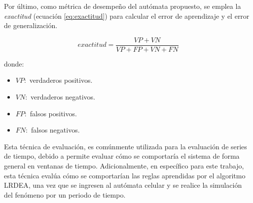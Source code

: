 Por último, como métrica de desempeño del autómata propuesto, se emplea la \emph{exactitud} (ecuación \ref{eq:exactitud}) para calcular el error de aprendizaje y el error de generalización.

\begin{equation} \label{eq:exactitud}
exactitud = \frac{VP + VN}{VP+FP+VN+FN} 
\end{equation}

donde:
\begin{itemize}
	\item $VP:$ verdaderos positivos.
	\item $VN:$ verdaderos negativos.
	\item $FP:$ falsos positivos.
	\item $FN:$ falsos negativos. 
\end{itemize}

Esta técnica de evaluación, es comúnmente utilizada para la evaluación de series de tiempo, debido a permite evaluar cómo se comportaría el sistema de forma general en ventanas de tiempo. Adicionalmente, en específico para este trabajo, esta técnica evalúa cómo se comportarían las reglas aprendidas por el algoritmo LRDEA, una vez que se ingresen al autómata celular y se realice la simulación del fenómeno por un periodo de tiempo.


